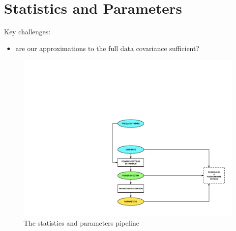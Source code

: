 \newpage

\section{Statistics and Parameters}

Key challenges:
\begin{itemize}
\item are our approximations to the full data covariance sufficient?
\end{itemize}

\begin{figure}[htbp]
\centering
\includegraphics[width=1\textwidth]{Analysis/sp}
\caption{The statistics and parameters pipeline}
\label{default}

\end{figure}


%




